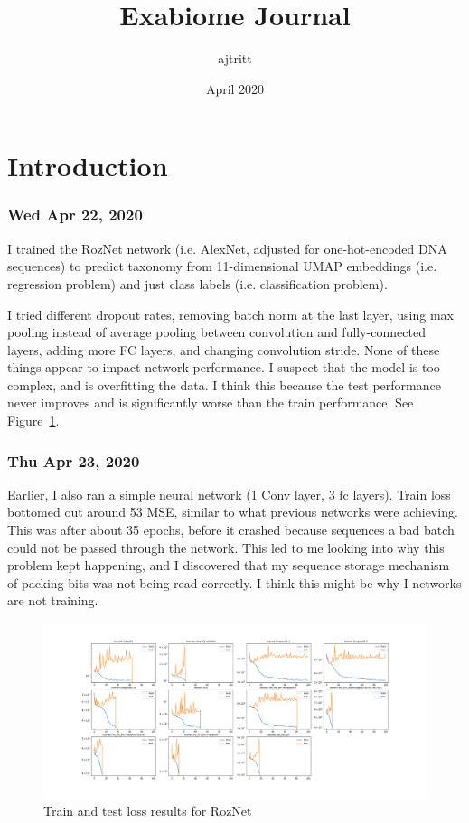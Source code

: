 \documentclass{article}
\title{Exabiome Journal}
\author{ajtritt }
\date{April 2020}
\begin{document}
\maketitle

\section{Introduction}

\subsubsection*{Wed Apr 22, 2020}

I trained the RozNet network (i.e. AlexNet, adjusted for one-hot-encoded DNA sequences) to predict taxonomy
from 11-dimensional UMAP embeddings (i.e. regression problem) and just class labels (i.e. classification problem).

I tried different dropout rates, removing batch norm at the last layer, using max pooling instead of average pooling
between convolution and fully-connected layers, adding more FC layers, and changing convolution stride. None of these
things appear to impact network performance. I suspect that the model is too complex, and is overfitting the data. I
think this because the test performance never improves and is significantly worse than the train performance. See
Figure~\ref{fig:roznet_train_test}.

\subsubsection*{Thu Apr 23, 2020}
Earlier, I also ran a simple neural network (1 Conv layer, 3 fc layers). Train loss bottomed out around 53 MSE, similar
to what previous networks were achieving. This was after about 35 epochs, before it crashed because sequences a bad
batch could not be passed through the network. This led to me looking into why this problem kept happening, and I discovered
that my sequence storage mechanism of packing bits was not being read correctly. I think this might be why I networks are
not training.


\begin{figure}
  \includegraphics[width=\linewidth]{roznet_results.png}
  \caption{Train and test loss results for RozNet}
  \label{fig:roznet_train_test}
\end{figure}
\end{document}
